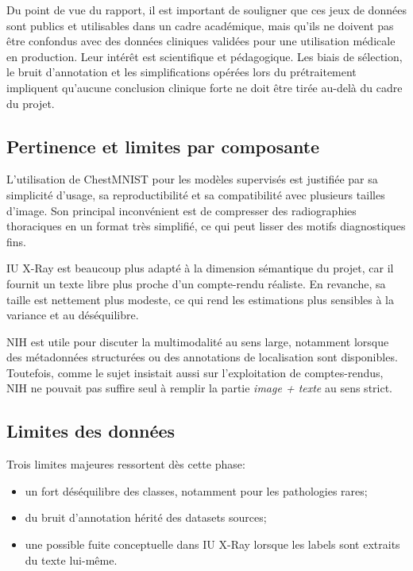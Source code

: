 \documentclass[11pt,a4paper]{article}
\begin{document}
Du point de vue du rapport, il est important de souligner que ces jeux de donn\'ees sont publics et utilisables dans un cadre acad\'emique, mais qu'ils ne doivent pas \^etre confondus avec des donn\'ees cliniques valid\'ees pour une utilisation m\'edicale en production. Leur int\'er\^et est scientifique et p\'edagogique. Les biais de s\'election, le bruit d'annotation et les simplifications op\'er\'ees lors du pr\'etraitement impliquent qu'aucune conclusion clinique forte ne doit \^etre tir\'ee au-del\`a du cadre du projet.

\subsection{Pertinence et limites par composante}
L'utilisation de ChestMNIST pour les mod\`eles supervis\'es est justifi\'ee par sa simplicit\'e d'usage, sa reproductibilit\'e et sa compatibilit\'e avec plusieurs tailles d'image. Son principal inconv\'enient est de compresser des radiographies thoraciques en un format tr\`es simplifi\'e, ce qui peut lisser des motifs diagnostiques fins.

IU X-Ray est beaucoup plus adapt\'e \`a la dimension s\'emantique du projet, car il fournit un texte libre plus proche d'un compte-rendu r\'ealiste. En revanche, sa taille est nettement plus modeste, ce qui rend les estimations plus sensibles \`a la variance et au d\'es\'equilibre.

NIH est utile pour discuter la multimodalit\'e au sens large, notamment lorsque des m\'etadonn\'ees structur\'ees ou des annotations de localisation sont disponibles. Toutefois, comme le sujet insistait aussi sur l'exploitation de comptes-rendus, NIH ne pouvait pas suffire seul \`a remplir la partie \emph{image + texte} au sens strict.

\subsection{Limites des donn\'ees}
Trois limites majeures ressortent d\`es cette phase:
\begin{itemize}
    \item un fort d\'es\'equilibre des classes, notamment pour les pathologies rares;
    \item du bruit d'annotation h\'erit\'e des datasets sources;
    \item une possible fuite conceptuelle dans IU X-Ray lorsque les labels sont extraits du texte lui-m\^eme.
\end{itemize}
\end{document}
